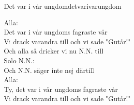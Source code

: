 \begin{song}{Det var i vår ungdom}{detvarivarungdom}
\begin{vers}
Alla:\\
Det var i vår ungdoms fagraste vår\\
Vi drack varandra till och vi sade "Gutår!"\\
Och alla så dricker vi nu N.N. till\\
Solo N.N.:\\
Och N.N. säger inte nej därtill\\
Alla:\\
Ty, det var i vår ungdoms fagraste vår\\
Vi drack varandra till och vi sade "Gutår!"\\
\end{vers}
\end{song}
